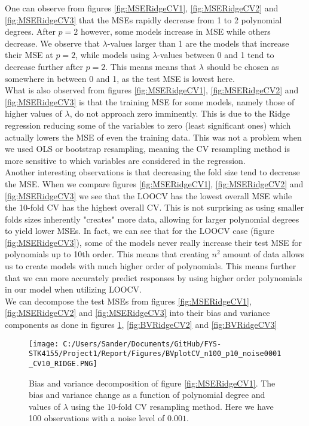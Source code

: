 \documentclass[12pt,a4paper]{article}
\begin{document}
\noindent One can observe from figures \ref{fig:MSERidgeCV1}, \ref{fig:MSERidgeCV2} and \ref{fig:MSERidgeCV3} that the MSEs rapidly decrease from 1 to 2 polynomial degrees. After $p = 2$ however, some models increase in MSE while others decrease. We observe that $\lambda$-values larger than 1 are the models that increase their MSE at $p = 2$, while models using $\lambda$-values between 0 and 1 tend to decrease further after $p = 2$. This means means that $\lambda$ should be chosen as somewhere in between 0 and 1, as the test MSE is lowest here.
\\
What is also observed from figures \ref{fig:MSERidgeCV1}, \ref{fig:MSERidgeCV2} and \ref{fig:MSERidgeCV3} is that the training MSE for some models, namely those of higher values of $\lambda$, do not approach zero imminently. This is due to the Ridge regression reducing some of the variables to zero (least significant ones) which actually lowers the MSE of even the training data. This was not a problem when we used OLS or bootstrap resampling, meaning the CV resampling method is more sensitive to which variables are considered in the regression. 
\\
Another interesting observations is that decreasing the fold size tend to decrease the MSE. When we compare figures \ref{fig:MSERidgeCV1}, \ref{fig:MSERidgeCV2} and \ref{fig:MSERidgeCV3} we see that the LOOCV has the lowest overall MSE while the 10-fold CV has the highest overall CV. This is not surprising as using smaller folds sizes inherently "creates" more data, allowing for larger polynomial degrees to yield lower MSEs. In fact, we can see that for the LOOCV case (figure \ref{fig:MSERidgeCV3}), some of the models never really increase their test MSE for polynomials up to 10th order. This means that creating $n^2$ amount of data allows us to create models with much higher order of polynomials. This means further that we can more accurately predict responses by using higher order polynomials in our model when utilizing LOOCV.
\\
We can decompose the test MSEs from figures \ref{fig:MSERidgeCV1}, \ref{fig:MSERidgeCV2} and \ref{fig:MSERidgeCV3} into their bias and variance components as done in figures \ref{fig:BVRidgeCV1}, \ref{fig:BVRidgeCV2} and \ref{fig:BVRidgeCV3}

\begin{figure}[H]
\centering
\texttt{[image: C:/Users/Sander/Documents/GitHub/FYS-STK4155/Project1/Report/Figures/BVplotCV\_n100\_p10\_noise0001\_CV10\_RIDGE.PNG]}
\caption{\label{fig:BVRidgeCV1} Bias and variance decomposition of figure \ref{fig:MSERidgeCV1}. The bias and variance change as a function of polynomial degree and values of $\lambda$ using the 10-fold CV resampling method. Here we have 100 observations with a noise level of $0.001$.}
\end{figure}
\end{document}
